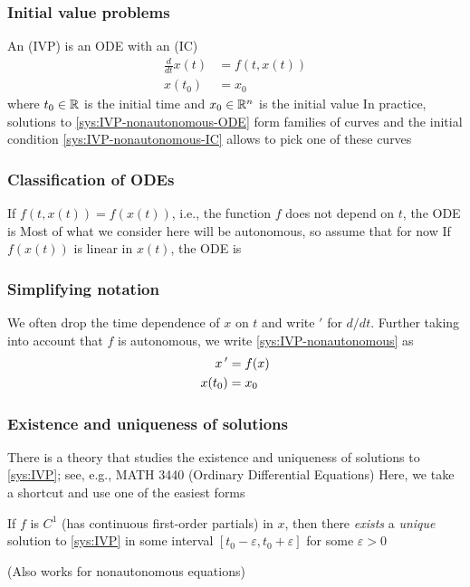 \documentclass[aspectratio=169]{beamer}
\begin{document}
\begin{frame}\frametitle{Initial value problems}
An  (IVP) is an ODE with an  (IC)
\begin{subequations}
\label{sys:IVP-nonautonomous}
\begin{align}
\frac{d}{dt}x(t) &= f(t,x(t))\label{sys:IVP-nonautonomous-ODE}\\
x(t_0) &= x_0\label{sys:IVP-nonautonomous-IC}
\end{align}
\end{subequations}
where $t_0\in\mathbb{R}$ is the initial time and $x_0\in\mathbb{R}^n$ is the initial value
\vfill
In practice, solutions to \eqref{sys:IVP-nonautonomous-ODE} form families of curves and the initial condition \eqref{sys:IVP-nonautonomous-IC} allows to pick one of these curves
\end{frame}

\begin{frame}\frametitle{Classification of ODEs}
If $f(t,x(t))=f(x(t))$, i.e., the function $f$ does not depend on $t$, the ODE is 
\vfill
Most of what we consider here will be autonomous, so assume that for now
\vfill
If $f(x(t))$ is linear in $x(t)$, the ODE is 
\end{frame}

\begin{frame}\frametitle{Simplifying notation}
We often drop the time dependence of $x$ on $t$ and write $'$ for $d/dt$. Further taking into account that $f$ is autonomous, we write \eqref{sys:IVP-nonautonomous} as
\begin{subequations}
\label{sys:IVP}
\begin{align}
x\,' &= f(x)\label{sys:IVP-ODE}\\
x(t_0) &= x_0\label{sys:IVP-IC}
\end{align}
\end{subequations}
\end{frame}

\begin{frame}\frametitle{Existence and uniqueness of solutions}
There is a theory that studies the existence and uniqueness of solutions to \eqref{sys:IVP}; see, e.g., MATH 3440 (Ordinary Differential Equations)
\vfill
Here, we take a shortcut and use one of the easiest forms
\vfill
\begin{theorem}
\label{th:existence-uniqueness-IVP}
If $f$ is $C^1$ (has continuous first-order partials) in $x$, then there \emph{exists} a \emph{unique} solution to \eqref{sys:IVP} in some interval $[t_0-\varepsilon,t_0+\varepsilon]$ for some $\varepsilon>0$
\end{theorem}
\vfill
(Also works for nonautonomous equations)
\end{frame}
\end{document}
